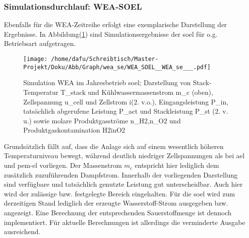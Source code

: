 \documentclass[onecolumn,10pt,titlepage]{article}
\begin{document}
\subsubsection{Simulationsdurchlauf: WEA-SOEL}
Ebenfalls für die WEA-Zeitreihe erfolgt eine exemplarische Darstellung der Ergebnisse. In Abbildung(\ref{fig:plt_se_WEA_SOEL}) sind Simulationsergebnisse der \gls{soel} für o.g. Betriebsart aufgetragen.
\begin{figure}[H]

	\centering
	\texttt{[image: /home/dafu/Schreibtisch/Master-Projekt/Doku/Abb/Graph/wea\_se/WEA\_SOEL\_\_WEA\_se\_\_\_.pdf]}

	\caption[Simulation WEA im Jahresbetrieb \gls{soel}]{Simulation WEA im Jahresbetrieb \gls{soel}; Darstellung von Stack-Temperatur \gls{T_stack} und Kühlwassermassenstrom \gls{m_c} (oben), Zellspannung \gls{u_cell} und Zellstrom \gls{i}(2. v.o.), Eingangsleistung \gls{P_in},  tatsächlich abgerufene Leistung \gls{P_act} und Stackleistung \gls{P_st} (2. v. u.) sowie molare Produktgasströme \gls{n_H2},\gls{n_O2} und Produktgaskontamination \gls{H2inO2}}
		\label{fig:plt_se_WEA_SOEL}
\end{figure}
Grundsätzlich fällt auf, dass die Anlage sich auf einem wesentlich höheren Temperaturniveau bewegt, während deutlich niedriger Zellspannungen als bei \gls{ael} und \gls{pem}-\gls{el} vorliegen. Der Massenstrom $m_c$ entspricht hier lediglich dem zusätzlich zuzuführenden Dampfstrom. Innerhalb der vorliegenden Darstellung sind verfügbare und tatsächlich genutzte Leistung gut unterscheidbar. Auch hier wird der zulässige bzw. festgelegte Bereich eingehalten. Für die \gls{soel} wird zum derzeitigen Stand lediglich der erzeugte Wasserstoff-Strom ausgegeben bzw. angezeigt. Eine Berechnung der entsprechenden Sauerstoffmenge ist dennoch implementiert. Für aktuelle Berechnungen ist allerdings die verminderte Ausgabe ausreichend.
\end{document}
